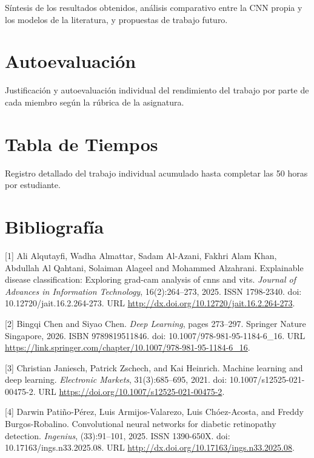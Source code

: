 \documentclass[11pt, a4paper]{article}
\numberwithin{equation}{section}
\begin{document}
Síntesis de los resultados obtenidos, análisis comparativo entre la CNN propia y los modelos de la literatura, y propuestas de trabajo futuro.

\newpage
\section{Autoevaluación}

Justificación y autoevaluación individual del rendimiento del trabajo por parte de cada miembro según la rúbrica de la asignatura.

\newpage
\section{Tabla de Tiempos}

Registro detallado del trabajo individual acumulado hasta completar las 50 horas por estudiante.

\newpage
\section{Bibliografía}

\noindent \hypertarget{ref:1}{[1]} Ali Alqutayfi, Wadha Almattar, Sadam Al-Azani, Fakhri Alam Khan, Abdullah Al Qahtani, Solaiman Alageel and Mohammed Alzahrani. Explainable disease classification: Exploring grad-cam analysis of cnns and vits. \textit{Journal of Advances in Information Technology}, 16(2):264--273, 2025. ISSN 1798-2340. doi: 10.12720/jait.16.2.264-273. URL \url{http://dx.doi.org/10.12720/jait.16.2.264-273}.

\smallskip

\noindent \hypertarget{ref:2}{[2]} Bingqi Chen and Siyao Chen. \textit{Deep Learning}, pages 273--297. Springer Nature Singapore, 2026. ISBN 9789819511846. doi: 10.1007/978-981-95-1184-6\_16. URL \url{https://link.springer.com/chapter/10.1007/978-981-95-1184-6_16}.

\smallskip

\noindent \hypertarget{ref:3}{[3]} Christian Janiesch, Patrick Zschech, and Kai Heinrich. Machine learning and deep learning. \textit{Electronic Markets}, 31(3):685--695, 2021. doi: 10.1007/s12525-021-00475-2. URL \url{https://doi.org/10.1007/s12525-021-00475-2}.

\smallskip

\noindent \hypertarget{ref:4}{[4]} Darwin Patiño-Pérez, Luis Armijos-Valarezo, Luis Chóez-Acosta, and Freddy Burgos-Robalino. Convolutional neural networks for diabetic retinopathy detection. \textit{Ingenius}, (33):91--101, 2025. ISSN 1390-650X. doi: 10.17163/ings.n33.2025.08. URL \url{http://dx.doi.org/10.17163/ings.n33.2025.08}.
\end{document}
